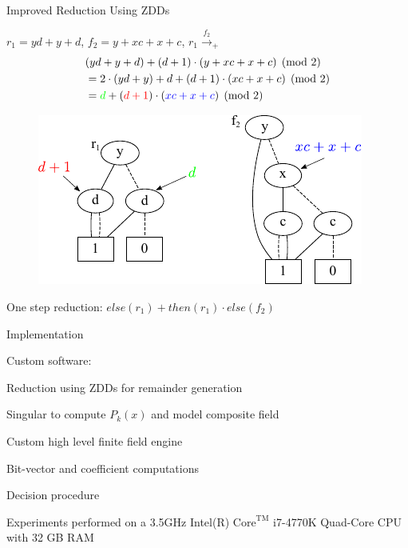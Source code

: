 \begin{frame}{\large{Improved Reduction Using ZDDs}}
\bi
  \item $r_1=yd + y + d$, $f_2=y + xc + x + c$, $r_1 \xrightarrow{f_2}_+$
        {\small
        \begin{align*}
          & (yd + y + d) + (d + 1)\cdot(y + xc + x + c) \pmod{2}\\
          &= 2\cdot(yd + y) + d + (d+1)\cdot(xc + x + c) \pmod{2}\\
          &= \textcolor{green}{d} + (\textcolor{red}{d+1})\cdot(\textcolor{blue}{xc + x + c})  \pmod{2}
        \end{align*}
        }
\ei
\begin{figure}[hbt]
\centering
\includegraphics[scale=0.9]{r1_f2_2.pdf}
\label{f2}
\end{figure}
\bi
  \item One step reduction: $else(r_1) + then(r_1)\cdot else(f_2)$
\ei
\end{frame}

\begin{frame}{\large Implementation}
\bi
	\item Custom software: 
	\bi
		\pause
		\vspace{0.1in}
		\item Reduction using ZDDs for remainder generation
		\vspace{0.1in}
		\pause
		\item Singular to compute $P_k(x)$ and model composite field
		\vspace{0.1in}
		\pause
		\item Custom high level finite field engine 
		\pause
		\bi
		\item Bit-vector and coefficient computations
		\item Decision procedure
		\ei
	\ei
	\pause
	\item Experiments performed on a 3.5GHz 
	Intel(R) $\text{Core}^{\text{TM}}$ i7-4770K Quad-Core CPU with 32 GB RAM
\ei
\end{frame}

